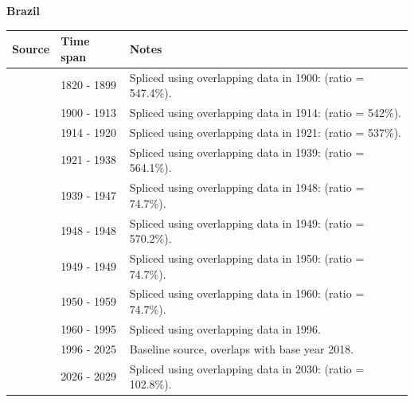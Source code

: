 \documentclass[12pt,a4paper,landscape]{article}
\begin{document}
\begin{adjustbox}{max totalsize={\paperwidth}{\paperheight},center}
\begin{minipage}[t][\textheight][t]{\textwidth}
\vspace*{0.5cm}
{}
\begin{center}
{\Large\bfseries Brazil}
\end{center}
\vspace{0.5cm}
\begin{table}[H]
\centering
\small
\begin{tabular}{|l|l|l|}
\hline
\textbf{Source} & \textbf{Time span} & \textbf{Notes} \\
\hline
\rowcolor{white}\cite{Tena}& 1820 - 1899 &Spliced using overlapping data in 1900: (ratio = 547.4\%).\\
\rowcolor{lightgray}\cite{UN_trade}& 1900 - 1913 &Spliced using overlapping data in 1914: (ratio = 542\%).\\
\rowcolor{white}\cite{Tena}& 1914 - 1920 &Spliced using overlapping data in 1921: (ratio = 537\%).\\
\rowcolor{lightgray}\cite{UN_trade}& 1921 - 1938 &Spliced using overlapping data in 1939: (ratio = 564.1\%).\\
\rowcolor{white}\cite{Mitchell}& 1939 - 1947 &Spliced using overlapping data in 1948: (ratio = 74.7\%).\\
\rowcolor{lightgray}\cite{UN_trade}& 1948 - 1948 &Spliced using overlapping data in 1949: (ratio = 570.2\%).\\
\rowcolor{white}\cite{Mitchell}& 1949 - 1949 &Spliced using overlapping data in 1950: (ratio = 74.7\%).\\
\rowcolor{lightgray}\cite{UN_trade}& 1950 - 1959 &Spliced using overlapping data in 1960: (ratio = 74.7\%).\\
\rowcolor{white}\cite{WDI}& 1960 - 1995 &Spliced using overlapping data in 1996.\\
\rowcolor{lightgray}\cite{OECD_EO}& 1996 - 2025 &Baseline source, overlaps with base year 2018.\\
\rowcolor{white}\cite{IMF_WEO_forecast}& 2026 - 2029 &Spliced using overlapping data in 2030: (ratio = 102.8\%).\\
\hline
\end{tabular}
\end{table}
\begin{figure}[H]
\centering

\end{figure}
\end{minipage}
\end{adjustbox}
\end{document}
